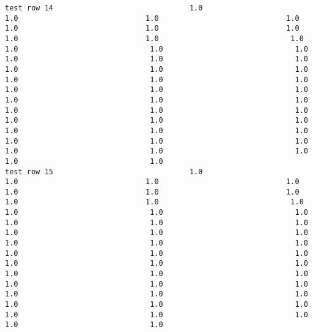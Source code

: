 \documentclass[11pt]{article}
\begin{document}
\begin{verbatim}
test row 14                               1.0                             1.0                             1.0                             1.0                             1.0                             1.0                             1.0                             1.0                             1.0                              1.0                              1.0                              1.0                              1.0                              1.0                              1.0                              1.0                              1.0                              1.0                              1.0                              1.0                              1.0                              1.0                              1.0                              1.0                              1.0                              1.0                              1.0                              1.0                              1.0                              1.0                              1.0                              1.0                              1.0                              1.0                              1.0                              1.0                              1.0                              1.0                              1.0                              1.0                              1.0                              1.0                              1.0                              1.0                              1.0
test row 15                               1.0                             1.0                             1.0                             1.0                             1.0                             1.0                             1.0                             1.0                             1.0                              1.0                              1.0                              1.0                              1.0                              1.0                              1.0                              1.0                              1.0                              1.0                              1.0                              1.0                              1.0                              1.0                              1.0                              1.0                              1.0                              1.0                              1.0                              1.0                              1.0                              1.0                              1.0                              1.0                              1.0                              1.0                              1.0                              1.0                              1.0                              1.0                              1.0                              1.0                              1.0                              1.0                              1.0                              1.0                              1.0

\end{verbatim}
\end{document}
